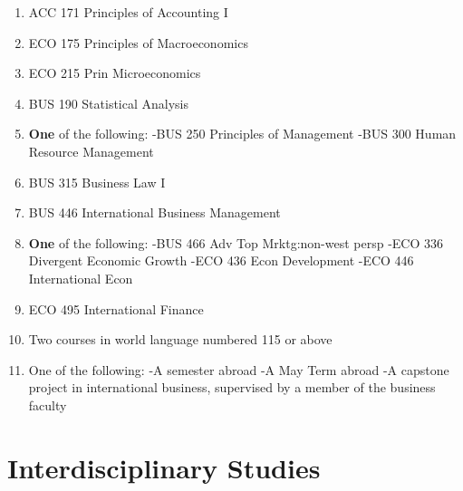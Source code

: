 \documentclass[
  letterpaper,
]{scrbook}
\begin{document}
\begin{enumerate}
\def\labelenumi{\arabic{enumi}.}
\item
  ACC 171 Principles of Accounting I
\item
  ECO 175 Principles of Macroeconomics
\item
  ECO 215 Prin Microeconomics
\item
  BUS 190 Statistical Analysis
\item
  \textbf{One} of the following: -BUS 250 Principles of Management -BUS
  300 Human Resource Management
\item
  BUS 315 Business Law I
\item
  BUS 446 International Business Management
\item
  \textbf{One} of the following: -BUS 466 Adv Top Mrktg:non-west persp
  -ECO 336 Divergent Economic Growth -ECO 436 Econ Development -ECO 446
  International Econ
\item
  ECO 495 International Finance
\item
  Two courses in world language numbered 115 or above
\item
  One of the following: -A semester abroad -A May Term abroad -A
  capstone project in international business, supervised by a member of
  the business faculty
\end{enumerate}

\section{Interdisciplinary Studies}\label{sec-interdisciplinary-studies}
\end{document}
